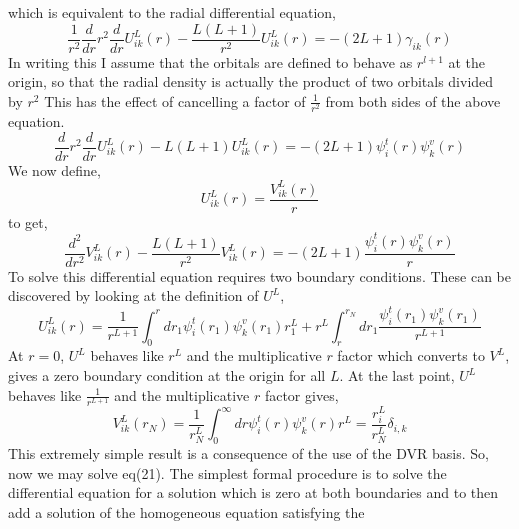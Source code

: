 \documentclass[preprint,showpacs,preprintnumbers,amsmath,amssymb]{revtex4}
\begin{document}
which is equivalent to the radial differential equation,
\begin{equation}
 \frac{1}{r^2} \frac{d}{dr} r^2 \frac {d}{dr} 
                 U^{L}_{ik}(r) 
              - \frac{L(L+1)}{r^2} U^{L}_{ik}(r) 
               = - (2L+1) \gamma_{ik}(r)      
\end{equation}
In writing this I assume that the orbitals are defined to behave as 
$r^{l+1}$ at the origin, so that the radial density is actually the product
of two orbitals divided by $r^2$  This has the effect of cancelling a 
factor of $\frac{1}{r^2}$ from both sides of the above equation. 
\begin{equation}
 \frac{d}{dr} r^2 \frac {d}{dr} U^{L}_{ik}(r) - L(L+1) U^{L}_{ik}(r) 
              = - (2L+1) \psi^{t}_{i}(r) \psi^{v}_{k}(r)
\end{equation}
We now define,
\begin{equation}
 U^{L}_{ik}(r)= \frac{ V^{L}_{ik}(r) }{r}
\end{equation}
to get,
\begin{equation}
 \frac{d^2}{dr^2} V^{L}_{ik}(r) - \frac{L(L+1)}{r^2} V^{L}_{ik}(r) 
              = - (2L+1) \frac {\psi^{t}_{i}(r) \psi^{v}_{k}(r) }{r}
\end{equation}
To solve this differential equation requires two boundary conditions.  
These can be discovered by looking at the definition of $U^{L}$,
\begin{equation}
  U^{L}_{ik}(r) = \frac{1}{r^{L+1}} \int_{0}^{r} dr_{1} 
                   \psi^{t}_{i}(r_{1}) \psi^{v}_{k}(r_{1}) r_{1}^{L}
                  + r^{L} \int_{r}^{r_{N}} dr_{1} 
         \frac { \psi^{t}_{i}(r_{1}) \psi^{v}_{k}(r_{1}) }{r^{L+1}}
\end{equation}
At $r=0$, $U^{L}$ behaves like $r^{L}$ and the multiplicative $r$ factor
which converts to $V^{L}$, gives a zero boundary condition at the origin
for all $L$.  At the last point, $U^{L}$ behaves like $\frac{1}{r^{L+1}}$ 
and the multiplicative $r$ factor gives,
\begin{equation}
 V^{L}_{ik}(r_{N}) = \frac{1}{r_{N}^{L}} \int_{0}^{\infty} dr 
                   \psi^{t}_{i}(r) \psi^{v}_{k}(r) r^{L}
                   = \frac{r^{L}_{i}}{r^{L}_{N}} \delta_{i,k} 
\end{equation}
This extremely simple result is a consequence of the use of the DVR basis.
So, now we may solve eq(21).  The simplest formal procedure is to solve
the differential equation for a solution which is zero at both boundaries
and to then add a solution of the homogeneous equation satisfying the
\end{document}
